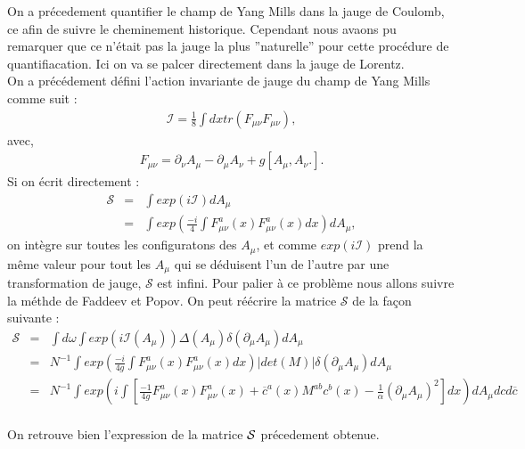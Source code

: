 \documentclass[a4paper,11pt]{article}
\theoremstyle{plain}
\theoremstyle{definition}
\theoremstyle{remark}
\numberwithin{equation}{section}
\numberwithin{equation}{subsection}
\numberwithin{figure}{section}
\begin{document}
\noindent
On a précedement quantifier le champ de Yang Mills dans la jauge de Coulomb, ce afin de suivre le cheminement historique. Cependant 
nous avaons pu remarquer que ce n'était pas la jauge la plus ''naturelle'' pour cette procédure de quantifiacation. Ici on va se palcer 
directement dans la jauge de Lorentz. \\
On a précédement défini l'action invariante de jauge du champ de Yang Mills comme suit :
\begin{eqnarray}
 \mathcal{I} = \frac{1}{8} \int dx tr ( F_{\mu \nu} F_{\mu \nu}  ) ,
\end{eqnarray}
avec,
\begin{eqnarray}
 F_{\mu \nu} = \partial_{\nu}A_{\mu} - \partial_{\mu}A_{\nu} + g \left[ A_{\mu} , A_{\nu} .\right] .
\end{eqnarray}
Si on écrit directement :
\begin{eqnarray}
 \mathcal{S} &=& \int exp\left( i \mathcal{I} \right) dA_{\mu}\\
	     &=& \int exp\left( \frac{-i}{4} \int F^{a}_{\mu\nu}(x)F^{a}_{\mu \nu}(x) dx \right) dA_{\mu}  ,
\end{eqnarray}
on intègre sur toutes les configuratons des $A_{\mu}$, et comme $exp\left( i \mathcal{I} \right)$ prend la même valeur pour tout 
les $A_{\mu}$ qui se déduisent l'un de l'autre par une transformation de jauge, $\mathcal{S}$ est infini. Pour palier à ce problème 
nous allons suivre la méthde de Faddeev et Popov.  On peut réécrire la matrice $\mathcal{S}$ de la façon suivante :
\begin{eqnarray}
 \mathcal{S} &=& \int d\omega \int exp\left( i \mathcal{I}(A_{\mu}) \right) 
\Delta(A_{\mu}) \delta \left(\partial_{\mu}A_{\mu}\right)dA_{\mu}\\
                 &=& N^{-1} \int exp\left( \frac{-i}{4g} \int F^{a}_{\mu\nu}(x)F^{a}_{\mu \nu}(x) dx \right) 
\left|det(M)\right| \delta \left(\partial_{\mu}A_{\mu}\right) dA_{\mu}\\
                 &=& N^{-1} \int exp\left(i \int \left[  
\frac{-1}{4g} F^{a}_{\mu\nu}(x)F^{a}_{\mu \nu}(x) + \overline{c}^{a}(x)M^{ab}c^{b}(x) - \frac{1}{\alpha} (\partial_{\mu}A_{\mu})^2  
\right] dx \right) dA_{\mu} dc d\overline{c}  \nonumber \\
\end{eqnarray}

\noindent
On retrouve bien l'expression de la matrice $\cal{S}$ précedement obtenue.

\end{document}

